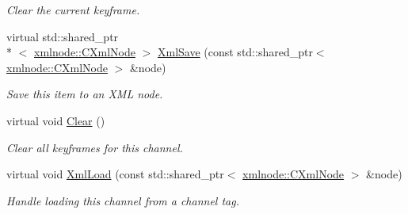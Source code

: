\begin{DoxyCompactItemize}
\begin{DoxyCompactList}\small\item\em Clear the current keyframe. \end{DoxyCompactList}\item 
virtual std\+::shared\+\_\+ptr\\*
$<$ \hyperlink{classxmlnode_1_1_c_xml_node}{xmlnode\+::\+C\+Xml\+Node} $>$ \hyperlink{class_c_anim_channel_ad4b87256e49f954eaf1dbcfa54fba34a}{Xml\+Save} (const std\+::shared\+\_\+ptr$<$ \hyperlink{classxmlnode_1_1_c_xml_node}{xmlnode\+::\+C\+Xml\+Node} $>$ \&node)
\begin{DoxyCompactList}\small\item\em Save this item to an X\+M\+L node. \end{DoxyCompactList}\item 
\hypertarget{class_c_anim_channel_ae9b7297011e630f9e621fee0dcac3a75}{virtual void \hyperlink{class_c_anim_channel_ae9b7297011e630f9e621fee0dcac3a75}{Clear} ()}\label{class_c_anim_channel_ae9b7297011e630f9e621fee0dcac3a75}

\begin{DoxyCompactList}\small\item\em Clear all keyframes for this channel. \end{DoxyCompactList}\item 
virtual void \hyperlink{class_c_anim_channel_a93a846ae42defd51e172ca922dfee742}{Xml\+Load} (const std\+::shared\+\_\+ptr$<$ \hyperlink{classxmlnode_1_1_c_xml_node}{xmlnode\+::\+C\+Xml\+Node} $>$ \&node)
\begin{DoxyCompactList}\small\item\em Handle loading this channel from a channel tag. \end{DoxyCompactList}\end{DoxyCompactItemize}
